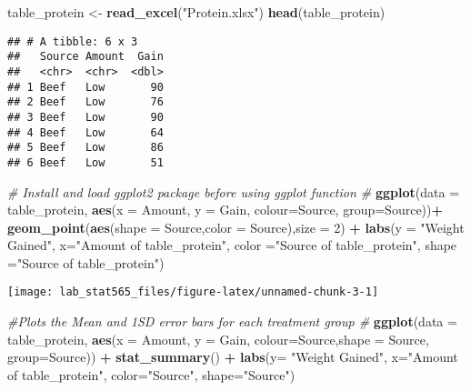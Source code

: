 \documentclass[]{article}
\newenvironment{Shaded}{\begin{snugshade}}{\end{snugshade}}
\newcommand{\CommentTok}[1]{\textcolor[rgb]{0.56,0.35,0.01}{\textit{#1}}}
\newcommand{\DataTypeTok}[1]{\textcolor[rgb]{0.13,0.29,0.53}{#1}}
\newcommand{\DecValTok}[1]{\textcolor[rgb]{0.00,0.00,0.81}{#1}}
\newcommand{\KeywordTok}[1]{\textcolor[rgb]{0.13,0.29,0.53}{\textbf{#1}}}
\newcommand{\NormalTok}[1]{#1}
\newcommand{\OperatorTok}[1]{\textcolor[rgb]{0.81,0.36,0.00}{\textbf{#1}}}
\newcommand{\StringTok}[1]{\textcolor[rgb]{0.31,0.60,0.02}{#1}}
\begin{document}
\begin{Shaded}
\begin{Highlighting}[]
\NormalTok{table_protein <-}\StringTok{ }\KeywordTok{read_excel}\NormalTok{(}\StringTok{"Protein.xlsx"}\NormalTok{)}
\KeywordTok{head}\NormalTok{(table_protein)}
\end{Highlighting}
\end{Shaded}

\begin{verbatim}
## # A tibble: 6 x 3
##   Source Amount  Gain
##   <chr>  <chr>  <dbl>
## 1 Beef   Low       90
## 2 Beef   Low       76
## 3 Beef   Low       90
## 4 Beef   Low       64
## 5 Beef   Low       86
## 6 Beef   Low       51
\end{verbatim}

\begin{Shaded}
\begin{Highlighting}[]
\CommentTok{# Install and load ggplot2 package before using ggplot function #}
\KeywordTok{ggplot}\NormalTok{(}\DataTypeTok{data =}\NormalTok{ table_protein, }\KeywordTok{aes}\NormalTok{(}\DataTypeTok{x =}\NormalTok{ Amount, }\DataTypeTok{y =}\NormalTok{ Gain, }\DataTypeTok{colour=}\NormalTok{Source, }\DataTypeTok{group=}\NormalTok{Source))}\OperatorTok{+}\StringTok{ }
\StringTok{  }\KeywordTok{geom_point}\NormalTok{(}\KeywordTok{aes}\NormalTok{(}\DataTypeTok{shape =}\NormalTok{ Source,}\DataTypeTok{color =}\NormalTok{ Source),}\DataTypeTok{size =} \DecValTok{2}\NormalTok{) }\OperatorTok{+}\StringTok{ }
\StringTok{  }\KeywordTok{labs}\NormalTok{(}\DataTypeTok{y =} \StringTok{"Weight Gained"}\NormalTok{, }\DataTypeTok{x=}\StringTok{"Amount of table_protein"}\NormalTok{, }\DataTypeTok{color =}\StringTok{"Source of table_protein"}\NormalTok{, }\DataTypeTok{shape =}\StringTok{"Source of table_protein"}\NormalTok{)}
\end{Highlighting}
\end{Shaded}

\texttt{[image: lab\_stat565\_files/figure-latex/unnamed-chunk-3-1]}

\begin{Shaded}
\begin{Highlighting}[]
\CommentTok{#Plots the Mean and 1SD error bars for each treatment group #}
\KeywordTok{ggplot}\NormalTok{(}\DataTypeTok{data =}\NormalTok{ table_protein, }\KeywordTok{aes}\NormalTok{(}\DataTypeTok{x =}\NormalTok{ Amount, }\DataTypeTok{y =}\NormalTok{ Gain, }\DataTypeTok{colour=}\NormalTok{Source,}\DataTypeTok{shape =}\NormalTok{ Source, }\DataTypeTok{group=}\NormalTok{Source)) }\OperatorTok{+}
\StringTok{  }\KeywordTok{stat_summary}\NormalTok{() }\OperatorTok{+}\StringTok{ }\KeywordTok{labs}\NormalTok{(}\DataTypeTok{y=} \StringTok{"Weight Gained"}\NormalTok{, }\DataTypeTok{x=}\StringTok{"Amount of table_protein"}\NormalTok{, }\DataTypeTok{color=}\StringTok{"Source"}\NormalTok{, }\DataTypeTok{shape=}\StringTok{"Source"}\NormalTok{)}
\end{Highlighting}
\end{Shaded}
\end{document}
